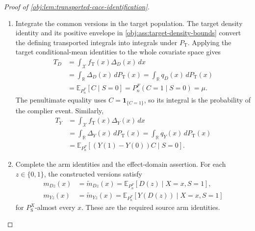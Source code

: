 \begin{proof}[Proof of \cref{obj:lem:transported-cace-identification}]
\begin{enumerate}
The density identities in
\cref{obj:ass:source-density-bounds,obj:ass:target-density-bounds}
transfer these equalities to the target covariate law. Indeed, if a Borel set \(B\) is source-null, then
\[
0=P_{\mathrm S}^{X}(B)
=\int_{B\cap\mathcal X}f_{\mathrm S}(x)\,dx
\ge c_f\int_{B\cap\mathcal X}1\,dx.
\]
Since \(c_f>0\), the set \(B\cap\mathcal X\) is Lebesgue-null, and consequently
\[
P_{\mathrm T}(B)
=\int_{B\cap\mathcal X}f_{\mathrm T}(x)\,dx=0.
\]
Thus
\[
P_{\mathrm T}\ll P_{\mathrm S}^{X},
\qquad
\Delta_D=q_D,\quad\Delta_Y=q_Y
\quad P_{\mathrm T}\text{-almost everywhere}.
\]
Together with the conditional-mean identities for \(q_D,q_Y\), this supplies common versions for both chains in the statement.

\item Integrate the common versions in the target population. The target density identity and its positive envelope in
\cref{obj:ass:target-density-bounds} convert the defining transported integrals into integrals under \(P_{\mathrm T}\). Applying the target conditional-mean identities to the whole covariate space gives
\[
\begin{aligned}
T_D
&=\int_{\mathcal X}f_{\mathrm T}(x)\Delta_D(x)\,dx\\
&=\int_{\mathbb R}\Delta_D(x)\,dP_{\mathrm T}(x)
 =\int_{\mathbb R}q_D(x)\,dP_{\mathrm T}(x)\\
&=\mathbb E_{P_n^F}[C\mid S=0]
 =P_n^F(C=1\mid S=0)=\mu.
\end{aligned}
\]
The penultimate equality uses
\(C=\mathbf1_{\{C=1\}}\), so its integral is the probability of the complier event. Similarly,
\[
\begin{aligned}
T_Y
&=\int_{\mathcal X}f_{\mathrm T}(x)\Delta_Y(x)\,dx\\
&=\int_{\mathbb R}\Delta_Y(x)\,dP_{\mathrm T}(x)
 =\int_{\mathbb R}q_Y(x)\,dP_{\mathrm T}(x)\\
&=\mathbb E_{P_n^F}[(Y(1)-Y(0))C\mid S=0].
\end{aligned}
\]

\item Complete the arm identities and the effect-domain assertion. For each \(z\in\{0,1\}\), the constructed versions satisfy
\[
\begin{aligned}
m_{Dz}(x)
&=\widetilde m_{Dz}(x)
 =\mathbb E_{P_n^F}[D(z)\mid X=x,S=1],\\
m_{Yz}(x)
&=\widetilde m_{Yz}(x)
 =\mathbb E_{P_n^F}[Y(D(z))\mid X=x,S=1]
\end{aligned}
\]
for \(P_{\mathrm S}^{X}\)-almost every \(x\). These are the required source arm identities.


\end{enumerate}
\end{proof}
